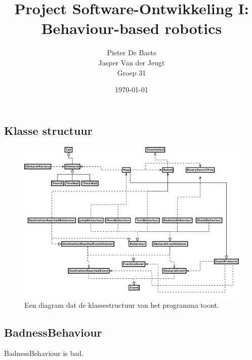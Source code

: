 \documentclass[a4paper,11pt]{article}
\title{Project Software-Ontwikkeling I: \\
       Behaviour-based robotics}
\author{Pieter De Baets \\
        Jasper Van der Jeugt \\
        Groep 31}
\date{\today}
\begin{document}
\maketitle
\subsection*{Klasse structuur}
\begin{figure}
\begin{center}
\includegraphics[width=\textwidth]{diagram.pdf}
\caption{Een diagram dat de klassestructuur van het programma toont.}
\label{fig:diagram}
\end{center}
\end{figure}

\subsection*{BadnessBehaviour}
BadnessBehaviour is bad.
\end{document}
